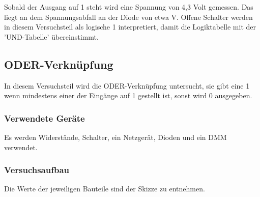 \documentclass[12pt,a4paper]{article}
\begin{document}
Sobald der Ausgang auf 1 steht wird eine Spannung von 4,3 Volt gemessen. Das liegt an dem Spannungsabfall an der Diode von etwa \unit[0,7]{V}.
Offene Schalter werden in diesem Versuchsteil als logische 1 interpretiert, damit die Logiktabelle mit der 'UND-Tabelle' übereinstimmt.

\subsection{ODER-Verknüpfung}

\label{sec:or}

In diesem Versuchsteil wird die ODER-Verknüpfung untersucht, sie gibt eine 1 wenn mindestens einer der Eingänge auf 1 gestellt ist, sonst wird 0 ausgegeben.

\subsubsection*{Verwendete Geräte}

Es werden Widerstände, Schalter, ein Netzgerät, Dioden und ein DMM verwendet.

\subsubsection*{Versuchsaufbau}

Die Werte der jeweiligen Bauteile sind der Skizze zu entnehmen.
\end{document}
